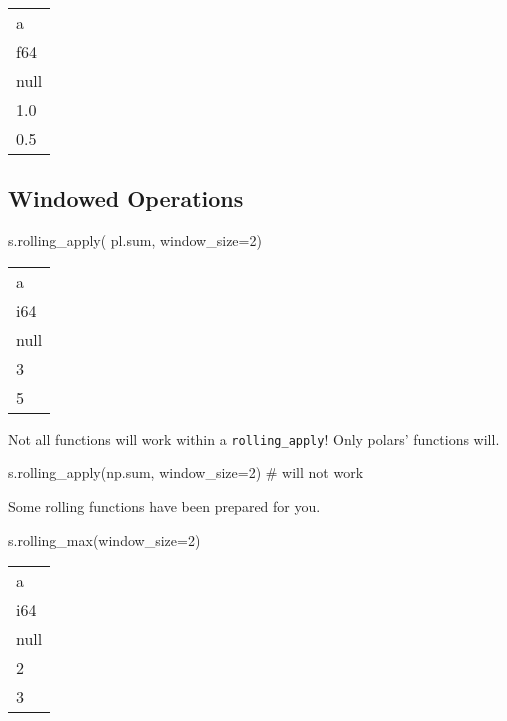 \documentclass[
  letterpaper,
  DIV=11,
  numbers=noendperiod]{scrartcl}
\newenvironment{Shaded}{\begin{snugshade}}{\end{snugshade}}
\newcommand{\BuiltInTok}[1]{\textcolor[rgb]{0.00,0.23,0.31}{#1}}
\newcommand{\CommentTok}[1]{\textcolor[rgb]{0.37,0.37,0.37}{#1}}
\newcommand{\DecValTok}[1]{\textcolor[rgb]{0.68,0.00,0.00}{#1}}
\newcommand{\NormalTok}[1]{\textcolor[rgb]{0.00,0.23,0.31}{#1}}
\newcommand{\OperatorTok}[1]{\textcolor[rgb]{0.37,0.37,0.37}{#1}}
\begin{document}
\begin{longtable}[]{@{}l@{}}
\toprule()
a \\
f64 \\
\midrule()
\endhead
null \\
1.0 \\
0.5 \\
\bottomrule()
\end{longtable}

\hypertarget{windowed-operations}{%
\subsection{Windowed Operations}\label{windowed-operations}}

\begin{Shaded}
\begin{Highlighting}[]
\NormalTok{s.rolling\_apply(}
\NormalTok{  pl.}\BuiltInTok{sum}\NormalTok{, }
\NormalTok{  window\_size}\OperatorTok{=}\DecValTok{2}\NormalTok{)}
\end{Highlighting}
\end{Shaded}

\begin{longtable}[]{@{}l@{}}
\toprule()
a \\
i64 \\
\midrule()
\endhead
null \\
3 \\
5 \\
\bottomrule()
\end{longtable}

Not all functions will work within a \texttt{rolling\_apply}! Only
polars' functions will.

\begin{Shaded}
\begin{Highlighting}[]
\NormalTok{s.rolling\_apply(np.}\BuiltInTok{sum}\NormalTok{, window\_size}\OperatorTok{=}\DecValTok{2}\NormalTok{) }\CommentTok{\# will not work}
\end{Highlighting}
\end{Shaded}

Some rolling functions have been prepared for you.

\begin{Shaded}
\begin{Highlighting}[]
\NormalTok{s.rolling\_max(window\_size}\OperatorTok{=}\DecValTok{2}\NormalTok{)}
\end{Highlighting}
\end{Shaded}

\begin{longtable}[]{@{}l@{}}
\toprule()
a \\
i64 \\
\midrule()
\endhead
null \\
2 \\
3 \\
\bottomrule()
\end{longtable}
\end{document}

